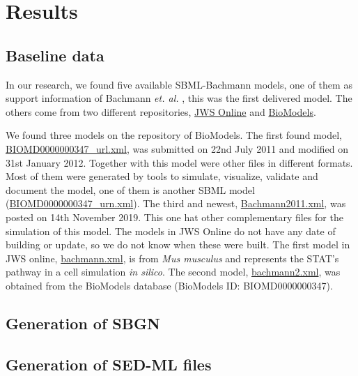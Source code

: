 \section*{Results} \label{sec:resuslt}
\subsection*{Baseline data}
In our research, we found five available SBML-Bachmann models, one of them as support information of Bachmann \textit{et. al.} \cite{bachmannmodel}, this was the first delivered model. The others come from two different repositories, \hyperlink{https://www.systemsmedicine.net/posts/jws-online-biological-systems-modelling}{JWS Online} and \hyperlink{https://www.ebi.ac.uk/biomodels/}{BioModels}.

We found three models on the repository of BioModels. The first found model, \hyperlink{https://www.ebi.ac.uk/biomodels/model/download/BIOMD0000000347.2?filename=BIOMD0000000347_url.xml}{\textsf{BIOMD0000000347\_url.xml}}, was submitted on 22nd July 2011 and modified on 31st January 2012. Together with this model were other files in different formats. Most of them were generated by tools to simulate, visualize, validate and document the model, one of them is another SBML model (\hyperlink{https://www.ebi.ac.uk/biomodels/model/download/BIOMD0000000347.2?filename=BIOMD0000000347_url.xml}{\textsf{BIOMD0000000347\_urn.xml}}). The third and newest, \hyperlink{https://www.ebi.ac.uk/biomodels/model/download/BIOMD0000000861.2?filename=Bachmann2011.xml}{\textsf{Bachmann2011.xml}}, was posted on 14th November 2019. This one hat other complementary files for the simulation of this model. The models in JWS Online do not have any date of building or update, so we do not know when these were built. The first model in JWS online, \hyperlink{https://jjj.bio.vu.nl/models/bachmann/sbml/?download=1}{\textsf{bachmann.xml}}, is from \textit{Mus musculus} and represents the STAT's pathway in a cell simulation \textit{in silico}. The second model, \hyperlink{https://jjj.bio.vu.nl/models/bachmann2/sbml/?download=1}{\textsf{bachmann2.xml}}, was obtained from the BioModels database (BioModels ID: BIOMD0000000347).

\subsection*{Generation of SBGN}

\subsection*{Generation of SED-ML files}


